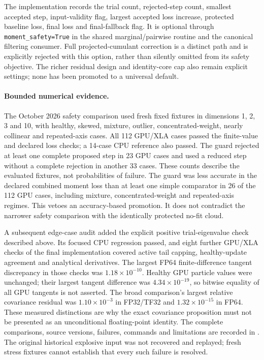 The implementation records the trial count, rejected-step count, smallest
accepted step, input-validity flag, largest accepted loss increase, protected
baseline loss, final loss and final-fallback flag.  It is optional through
\texttt{moment\_safety=True} in the shared marginal/pairwise routine and the
canonical filtering consumer.  Full projected-cumulant correction is a distinct
path and is explicitly rejected with this option, rather than silently omitted
from its safety objective.  The richer residual design and identity-core cap
also remain explicit settings; none has been promoted to a universal default.


\paragraph{Bounded numerical evidence.}
The October 2026 safety comparison used fresh fixed fixtures in dimensions
1, 2, 3 and 10, with healthy, skewed, mixture, outlier, concentrated-weight,
nearly collinear and repeated-axis cases.  All 112 GPU/XLA cases passed the
finite-value and declared loss checks; a 14-case CPU reference also passed.
The guard rejected at least one complete proposed step in 23 GPU cases and
used a reduced step without a complete rejection in another 33 cases.
These counts describe the evaluated fixtures, not probabilities of failure.
The guard was less accurate in the declared combined moment loss than at least
one simple comparator in 26 of the 112 GPU cases, including mixture,
concentrated-weight and repeated-axis regimes.  This vetoes an accuracy-based
promotion.  It does not contradict the narrower safety comparison with the
identically protected no-fit cloud.

A subsequent edge-case audit added the explicit positive trial-eigenvalue
check described above.  Its focused CPU regression passed, and eight further
GPU/XLA checks of the final implementation covered active tail capping,
healthy-update agreement and analytical derivatives.  The largest FP64
finite-difference tangent discrepancy in those checks was
\(1.18\times10^{-10}\).  Healthy GPU particle values were unchanged; their
largest tangent difference was \(4.34\times10^{-19}\), so bitwise equality of
all GPU tangents is not asserted.  The broad comparison's largest relative
covariance residual was \(1.10\times10^{-3}\) in FP32/TF32 and
\(1.32\times10^{-15}\) in FP64.  These measured distinctions are why the
exact covariance proposition must not be presented as an unconditional
floating-point identity.  The complete comparisons, source versions, failures,
commands and limitations are recorded in
.
The original historical explosive input was not recovered and replayed;
fresh stress fixtures cannot establish that every such failure is resolved.

